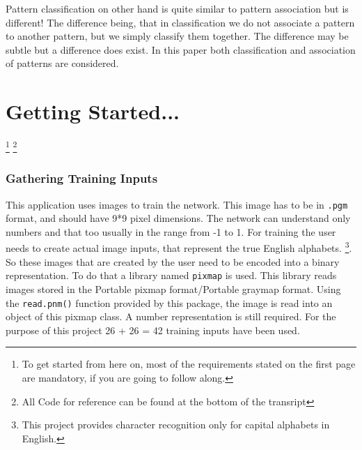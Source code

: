 \documentclass[a4paper,12pt]{report}
\begin{document}
Pattern classification on other hand is quite similar to pattern association but is different! The difference being, that in classification
we do not associate a pattern to another pattern, but we simply classify them together. The difference may be subtle but a difference does exist.
In this paper both classification and association of patterns are considered.



\section*{Getting Started...}
\footnote{To get started from here on, most of the requirements stated on the first page are mandatory, if you are going to follow along.}
\footnote{All Code for reference can be found at the bottom of the transript}

\subsubsection*{Gathering Training Inputs}
This application uses images to train the network. This image has to be in \verb+.pgm+ format, and should have 9*9 pixel dimensions. The network can understand
only numbers and that too usually in the range from -1 to 1. For training the user needs to create actual image inputs, that represent the true English alphabets.
\footnote{This project provides character recognition only for capital alphabets in English.}. So these images that are created by the user need to be encoded into a binary representation.
To do that a library named \verb+pixmap+ is used. This library reads images stored in the Portable pixmap format/Portable graymap format. 
Using the \verb+read.pnm()+  function provided by this package, the image is read into an object of this pixmap class. 
A number representation is still required. For the purpose of this project 26 + 26 = 42 training inputs have been used.
\end{document}

